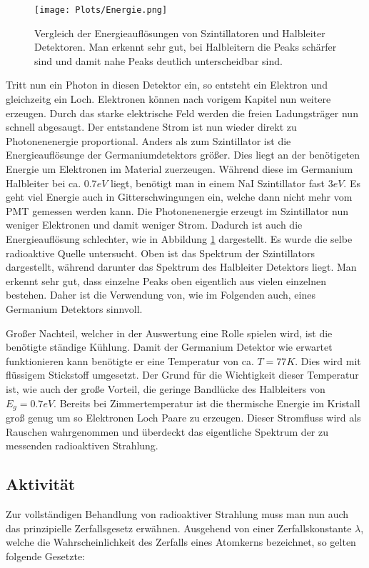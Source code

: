 \documentclass[]{article}
\begin{document}
\begin{figure}[H]
\centering
\texttt{[image: Plots/Energie.png]}
\caption{Vergleich der Energieauflösungen von Szintillatoren und Halbleiter Detektoren. Man erkennt sehr gut, bei Halbleitern die Peaks schärfer sind und damit nahe Peaks deutlich unterscheidbar sind.}
\label{fig:energiaufloesung}
\end{figure}

Tritt nun ein Photon in diesen Detektor ein, so entsteht ein Elektron und gleichzeitg ein Loch. Elektronen können nach vorigem Kapitel nun weitere erzeugen. Durch das starke elektrische Feld werden die freien Ladungsträger nun schnell abgesaugt. Der entstandene Strom ist nun wieder direkt zu Photonenenergie proportional. Anders als zum Szintillator ist die Energieauflösunge der Germaniumdetektors größer. Dies liegt an der benötigeten Energie um Elektronen im Material zuerzeugen. Während diese im Germanium Halbleiter bei ca. $0.7eV$ liegt, benötigt man in einem NaI Szintillator fast $3eV$. \cite{energieaufloesung} Es geht viel Energie auch in Gitterschwingungen ein, welche dann nicht mehr vom PMT gemessen werden kann. Die Photonenenergie erzeugt im Szintillator nun weniger Elektronen und damit weniger Strom. Dadurch ist auch die Energieauflösung schlechter, wie in Abbildung \ref{fig:energiaufloesung} dargestellt. Es wurde die selbe radioaktive Quelle untersucht. Oben ist das Spektrum der Szintillators dargestellt, während darunter das Spektrum des Halbleiter Detektors liegt. Man erkennt sehr gut, dass einzelne Peaks oben eigentlich aus vielen einzelnen bestehen. Daher ist die Verwendung von, wie im Folgenden auch, eines Germanium Detektors sinnvoll.

Großer Nachteil, welcher in der Auswertung eine Rolle spielen wird, ist die benötigte ständige Kühlung. Damit der Germanium Detektor wie erwartet funktionieren kann benötigte er eine Temperatur von ca. $T=77K$. Dies wird mit flüssigem Stickstoff umgesetzt. Der Grund für die Wichtigkeit dieser Temperatur ist, wie auch der große Vorteil, die geringe Bandlücke des Halbleiters von $E_g=0.7eV$. Bereits bei Zimmertemperatur ist die thermische Energie im Kristall groß genug um so Elektronen Loch Paare zu erzeugen. Dieser Stromfluss wird als Rauschen wahrgenommen und überdeckt das eigentliche Spektrum der zu messenden radioaktiven Strahlung.


\subsection{Aktivität}
Zur vollständigen Behandlung von radioaktiver Strahlung muss man nun auch das prinzipielle Zerfallsgesetz erwähnen. Ausgehend von einer Zerfallskonstante $\lambda$, welche die Wahrscheinlichkeit des Zerfalls eines Atomkerns bezeichnet, so gelten folgende Gesetzte:
\end{document}
